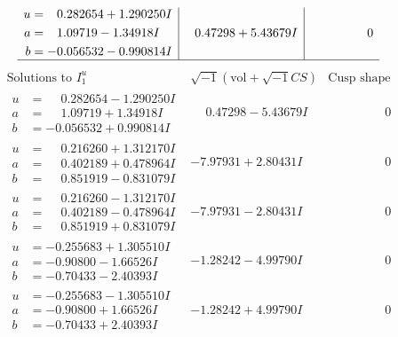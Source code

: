 \documentclass[1p]{elsarticle_modified}
\theoremstyle{definition}
\newcommand{\I}{\sqrt{-1}}
\begin{document}
$$\begin{array}{c|c|c}
\begin{aligned}
u &= \phantom{-}0.282654 + 1.290250 I \\
a &= \phantom{-}1.09719 - 1.34918 I \\
b &= -0.056532 - 0.990814 I\end{aligned}
 & \phantom{-}0.47298 + 5.43679 I & \phantom{-0.000000 } 0\\
 \hline 
 \end{array}$$\newpage$$\begin{array}{c|c|c}  
\text{Solutions to }I^u_{1}& \I (\text{vol} + \sqrt{-1}CS) & \text{Cusp shape}\\
 \hline 
\begin{aligned}
u &= \phantom{-}0.282654 - 1.290250 I \\
a &= \phantom{-}1.09719 + 1.34918 I \\
b &= -0.056532 + 0.990814 I\end{aligned}
 & \phantom{-}0.47298 - 5.43679 I & \phantom{-0.000000 } 0 \\ \hline\begin{aligned}
u &= \phantom{-}0.216260 + 1.312170 I \\
a &= \phantom{-}0.402189 + 0.478964 I \\
b &= \phantom{-}0.851919 - 0.831079 I\end{aligned}
 & -7.97931 + 2.80431 I & \phantom{-0.000000 } 0 \\ \hline\begin{aligned}
u &= \phantom{-}0.216260 - 1.312170 I \\
a &= \phantom{-}0.402189 - 0.478964 I \\
b &= \phantom{-}0.851919 + 0.831079 I\end{aligned}
 & -7.97931 - 2.80431 I & \phantom{-0.000000 } 0 \\ \hline\begin{aligned}
u &= -0.255683 + 1.305510 I \\
a &= -0.90800 - 1.66526 I \\
b &= -0.70433 - 2.40393 I\end{aligned}
 & -1.28242 - 4.99790 I & \phantom{-0.000000 } 0 \\ \hline\begin{aligned}
u &= -0.255683 - 1.305510 I \\
a &= -0.90800 + 1.66526 I \\
b &= -0.70433 + 2.40393 I\end{aligned}
 & -1.28242 + 4.99790 I & \phantom{-0.000000 } 0 \\ \hline\begin{aligned}

\end{aligned}
\end{array}$$
\end{document}
